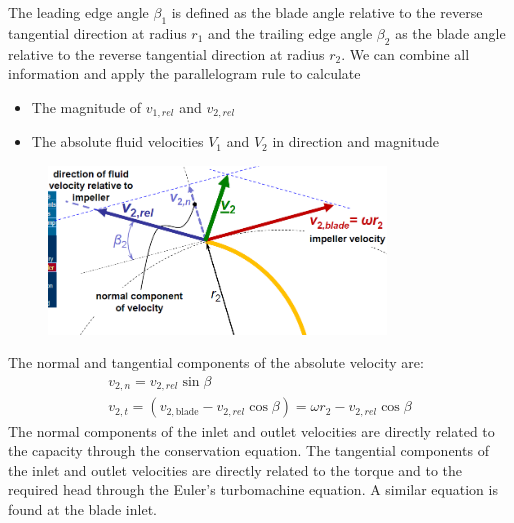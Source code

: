 \documentclass[class=report, crop=false, 12pt,a4paper]{standalone}
\begin{document}
The leading edge angle $\beta_1$ is defined as the blade angle relative to the reverse tangential direction at radius $r_1$ and the trailing edge angle $\beta_2$ as the blade angle relative to the reverse tangential direction at radius $r_2$. We can combine all information and apply the parallelogram rule to calculate
\begin{itemize}
  \item The magnitude of $v_{1, rel}$ and $v_{2, rel}$
  \item The absolute fluid velocities $V_1$ and $V_2$ in direction and magnitude
\end{itemize}
\begin{figure}[H]
  \centering
  \includegraphics[width = 0.8\textwidth]{../img/diagram8.png}
\end{figure}
The normal and tangential components of the absolute velocity are:
\begin{gather}
  v_{2,n} = v_{2,rel} \sin{\beta} \\
  v_{2,t} = (v_{2,\textrm{blade}} - v_{2, rel} \cos{\beta}) = \omega r_2 - v_{2,rel}\cos{\beta}
\end{gather}
The normal components of the inlet and outlet velocities are directly related to the capacity through the conservation equation. The tangential components of the inlet and outlet velocities are directly related to the torque and to the required head through the Euler's turbomachine equation. A similar equation is found at the blade inlet.
\end{document}
